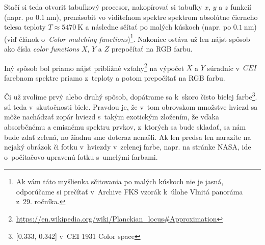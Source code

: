 Stačí si teda otvoriť tabuľkový procesor, nakopírovať si tabuľky $x$, $y$ a $z$ funkcií (napr. po $\SI{0.1}{\nano\metre}$), prenásobiť vo viditeľnom spektre spektrom
absolútne čierneho telesa teploty $T \approx \SI{5470}{\kelvin}$ a následne sčítať po malých kúskoch (napr. po $\SI{0.1}{\nano\metre}$)
(viď článok o~\emph{Color matching functions})\footnote{Ak vám táto myšlienka sčitovania po malých kúskoch nie je jasná,
odporúčame si prečítať v~Archive FKS vzorák k~úlohe Vlnitá panoráma z~29. ročníka.}. Nakoniec ostáva už len nájsť spôsob ako čísla \emph{color functions} $X$, $Y$ a $Z$ prepočítať na RGB farbu. 

Iný spôsob bol priamo nájsť približné vzťahy\footnote{\url{https://en.wikipedia.org/wiki/Planckian_locus\#Approximation}} na výpočet $X$ a $Y$ súradníc v~$CEI$ farebnom spektre priamo z~teploty a potom prepočítať na RGB farbu.

Či už zvolíme prvý alebo druhý spôsob, dopátrame sa k~skoro čisto bielej farbe\footnote{[0.333, 0.342] v~CEI 1931 Color space}.
 sú teda v~skutočnosti biele. Pravdou je, že v~tom obrovskom množstve hviezd sa môže
nachádzať zopár hviezd s~takým exotickým zložením, že vďaka absorbčnému a emisnému spektru prvkov, z~ktorých sa bude skladať,
sa nám bude zdať zelená, no žiadnu sme doteraz nenašli. Ak len predsa len narazíte na nejaký obrázok
či fotku v~hviezdy v~zelenej farbe, napr. na stránke NASA, ide o~počítačovo upravenú fotku s~umelými farbami.
